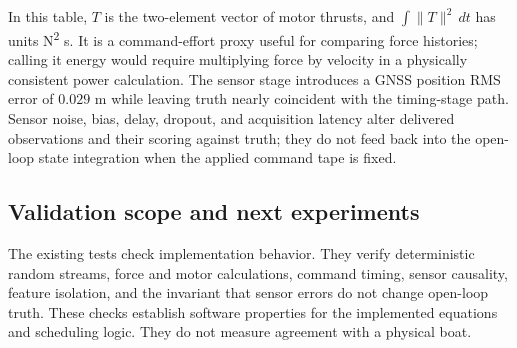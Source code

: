 \documentclass[10pt,letterpaper]{article}
\begin{document}
In this table, \(T\) is the two-element vector of motor thrusts, and \(\int\lVert T\rVert^2\,dt\) has units N\textsuperscript{2} s. It is a command-effort proxy useful for comparing force histories; calling it energy would require multiplying force by velocity in a physically consistent power calculation. The sensor stage introduces a GNSS position RMS error of \(0.029\) m while leaving truth nearly coincident with the timing-stage path. Sensor noise, bias, delay, dropout, and acquisition latency alter delivered observations and their scoring against truth; they do not feed back into the open-loop state integration when the applied command tape is fixed.

\subsection{Validation scope and next experiments}

The existing tests check implementation behavior. They verify deterministic random streams, force and motor calculations, command timing, sensor causality, feature isolation, and the invariant that sensor errors do not change open-loop truth. These checks establish software properties for the implemented equations and scheduling logic. They do not measure agreement with a physical boat.
\end{document}
